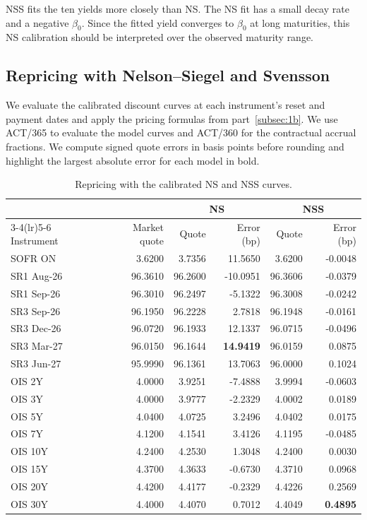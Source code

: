 \documentclass[11pt,a4paper]{article}
\begin{document}
NSS fits the ten yields more closely than NS. The NS fit has a
small decay rate and a negative \(\beta_0\). Since the fitted
yield converges to \(\beta_0\) at long maturities, this NS
calibration should be interpreted over the observed maturity range.

\subsection{Repricing with Nelson--Siegel and Svensson}
\label{subsec:2b}

We evaluate the calibrated discount curves at each instrument's
reset and payment dates and apply the pricing formulas from
part~\ref{subsec:1b}. We use ACT/365 to evaluate the model curves
and ACT/360 for the contractual accrual fractions. We compute
signed quote errors in basis points before rounding and highlight
the largest absolute error for each model in bold.

\begin{table}[H]
  \centering
  \caption{Repricing with the calibrated NS and NSS curves.}
  \label{tab:ns-nss-repricing}
  \begin{tabular}{lrrrrr}
    \toprule
    & & \multicolumn{2}{c}{NS} & \multicolumn{2}{c}{NSS} \\
    \cmidrule(lr){3-4}\cmidrule(lr){5-6}
    Instrument & Market quote & Quote & Error (bp) & Quote & Error (bp) \\
    \midrule
    SOFR ON    &  3.6200 &  3.7356 &  11.5650 &  3.6200 & -0.0048 \\
    SR1 Aug-26 & 96.3610 & 96.2600 & -10.0951 & 96.3606 & -0.0379 \\
    SR1 Sep-26 & 96.3010 & 96.2497 &  -5.1322 & 96.3008 & -0.0242 \\
    SR3 Sep-26 & 96.1950 & 96.2228 &   2.7818 & 96.1948 & -0.0161 \\
    SR3 Dec-26 & 96.0720 & 96.1933 &  12.1337 & 96.0715 & -0.0496 \\
    SR3 Mar-27 & 96.0150 & 96.1644 & \textbf{14.9419} & 96.0159 & 0.0875 \\
    SR3 Jun-27 & 95.9990 & 96.1361 &  13.7063 & 96.0000 &  0.1024 \\
    OIS 2Y     &  4.0000 &  3.9251 &  -7.4888 &  3.9994 & -0.0603 \\
    OIS 3Y     &  4.0000 &  3.9777 &  -2.2329 &  4.0002 &  0.0189 \\
    OIS 5Y     &  4.0400 &  4.0725 &   3.2496 &  4.0402 &  0.0175 \\
    OIS 7Y     &  4.1200 &  4.1541 &   3.4126 &  4.1195 & -0.0485 \\
    OIS 10Y    &  4.2400 &  4.2530 &   1.3048 &  4.2400 &  0.0030 \\
    OIS 15Y    &  4.3700 &  4.3633 &  -0.6730 &  4.3710 &  0.0968 \\
    OIS 20Y    &  4.4200 &  4.4177 &  -0.2329 &  4.4226 &  0.2569 \\
    OIS 30Y    &  4.4000 &  4.4070 &   0.7012 &  4.4049 & \textbf{0.4895} \\
    \bottomrule
  \end{tabular}
\end{table}
\end{document}
